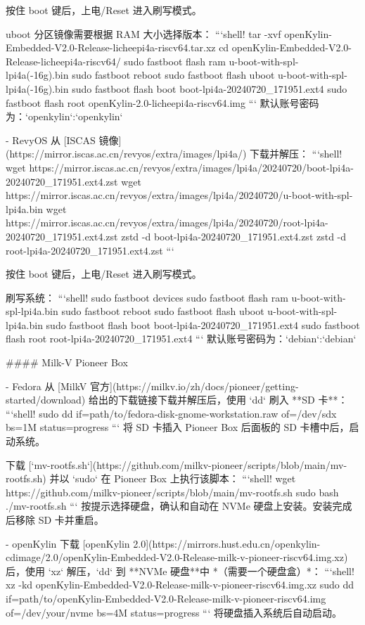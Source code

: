 \documentclass{article}
\begin{document}
\begin{markdown}
按住 boot 键后，上电/Reset 进入刷写模式。

uboot 分区镜像需要根据 RAM 大小选择版本：
```shell!
tar -xvf openKylin-Embedded-V2.0-Release-licheepi4a-riscv64.tar.xz
cd openKylin-Embedded-V2.0-Release-licheepi4a-riscv64/
sudo fastboot flash ram u-boot-with-spl-lpi4a(-16g).bin
sudo fastboot reboot
sudo fastboot flash uboot u-boot-with-spl-lpi4a(-16g).bin
sudo fastboot flash boot boot-lpi4a-20240720_171951.ext4
sudo fastboot flash root openKylin-2.0-licheepi4a-riscv64.img
```
默认账号密码为：`openkylin`:`openkylin`

- RevyOS
从 [ISCAS 镜像](https://mirror.iscas.ac.cn/revyos/extra/images/lpi4a/) 下载并解压：
```shell!
wget https://mirror.iscas.ac.cn/revyos/extra/images/lpi4a/20240720/boot-lpi4a-20240720_171951.ext4.zst
wget https://mirror.iscas.ac.cn/revyos/extra/images/lpi4a/20240720/u-boot-with-spl-lpi4a.bin
wget https://mirror.iscas.ac.cn/revyos/extra/images/lpi4a/20240720/root-lpi4a-20240720_171951.ext4.zst
zstd -d boot-lpi4a-20240720_171951.ext4.zst
zstd -d root-lpi4a-20240720_171951.ext4.zst
```

按住 boot 键后，上电/Reset 进入刷写模式。

刷写系统：
```shell!
sudo fastboot devices
sudo fastboot flash ram u-boot-with-spl-lpi4a.bin 
sudo fastboot reboot
sudo fastboot flash uboot u-boot-with-spl-lpi4a.bin
sudo fastboot flash boot boot-lpi4a-20240720_171951.ext4
sudo fastboot flash root root-lpi4a-20240720_171951.ext4
```
默认账号密码为：`debian`:`debian`

#### Milk-V Pioneer Box

- Fedora
从 [MilkV 官方](https://milkv.io/zh/docs/pioneer/getting-started/download) 给出的下载链接下载并解压后，使用 `dd` 刷入 **SD 卡**：
```shell!
sudo dd if=path/to/fedora-disk-gnome-workstation.raw of=/dev/sdx bs=1M status=progress
```
将 SD 卡插入 Pioneer Box 后面板的 SD 卡槽中后，启动系统。

下载 [`mv-rootfs.sh`](https://github.com/milkv-pioneer/scripts/blob/main/mv-rootfs.sh) 并以 `sudo` 在 Pioneer Box 上执行该脚本：
```shell!
wget https://github.com/milkv-pioneer/scripts/blob/main/mv-rootfs.sh
sudo bash ./mv-rootfs.sh
```
按提示选择硬盘，确认和自动在 NVMe 硬盘上安装。安装完成后移除 SD 卡并重启。

- openKylin
下载 [openKylin 2.0](https://mirrors.hust.edu.cn/openkylin-cdimage/2.0/openKylin-Embedded-V2.0-Release-milk-v-pioneer-riscv64.img.xz) 后，使用 `xz` 解压，`dd` 到 **NVMe 硬盘**中 *（需要一个硬盘盒）*：
```shell!
xz -kd openKylin-Embedded-V2.0-Release-milk-v-pioneer-riscv64.img.xz
sudo dd if=path/to/openKylin-Embedded-V2.0-Release-milk-v-pioneer-riscv64.img of=/dev/your/nvme bs=4M status=progress
```
将硬盘插入系统后自动启动。


\end{markdown}
\end{document}
